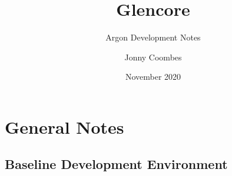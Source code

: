 \documentclass{book}
\title{Glencore}
\subtitle{Argon Development Notes}
\author{Jonny Coombes}
\date{November 2020}
\begin{document}
\maketitle
{}
\newpage
\tableofcontents
\newpage
{}

\chapter{General Notes}

\section{Baseline Development Environment}
\end{document}
